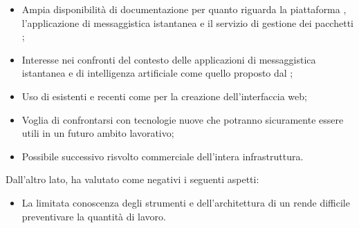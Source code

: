 \begin{itemize}

	\item Ampia disponibilità di documentazione per quanto riguarda la piattaforma , l'applicazione di messaggistica istantanea  e il servizio di gestione dei pacchetti ;
	
	\item Interesse nei confronti del contesto delle applicazioni di messaggistica istantanea e di intelligenza artificiale come quello proposto dal ; 
	
	\item Uso di  esistenti e recenti come  per la creazione dell’interfaccia web;
	
	\item Voglia di confrontarsi con tecnologie nuove che potranno sicuramente essere utili in un futuro ambito lavorativo;
	
	\item Possibile successivo risvolto commerciale dell'intera infrastruttura.

\end{itemize}

Dall'altro lato, ha valutato come negativi i seguenti aspetti:

\begin{itemize}

	\item La limitata conoscenza degli strumenti e dell'architettura di un  rende difficile preventivare la quantità di lavoro.

\end{itemize} 

\newpage